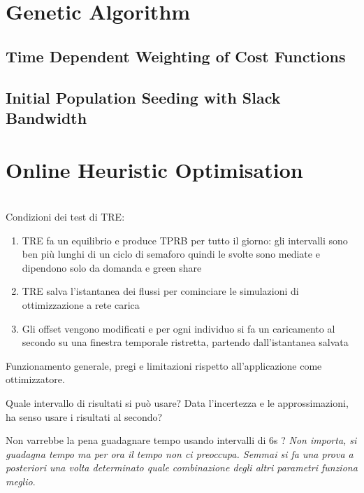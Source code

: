 
\section{Genetic Algorithm}
\subsection{Time Dependent Weighting of Cost Functions}


\subsection{Initial Population Seeding with Slack Bandwidth}




\section{Online Heuristic Optimisation}
\\
Condizioni dei test di TRE:
\begin{enumerate}
\item TRE fa un equilibrio e produce TPRB per tutto il giorno: gli intervalli sono ben più lunghi di un ciclo di semaforo quindi le svolte sono mediate e dipendono solo da domanda e green share
\item TRE salva l'istantanea dei flussi per cominciare le simulazioni di ottimizzazione a rete carica
\item Gli offset vengono modificati e per ogni individuo si fa un caricamento al secondo su una finestra temporale ristretta, partendo dall'istantanea salvata
\end{enumerate}






Funzionamento generale, pregi e limitazioni rispetto all'applicazione come ottimizzatore.

Quale intervallo di risultati si può usare? Data l'incertezza e le approssimazioni, ha senso usare i risultati al secondo?

Non varrebbe la pena guadagnare tempo usando intervalli di 6s ?
\emph{Non importa, si guadagna tempo ma per ora il tempo non ci preoccupa. Semmai si fa una prova a posteriori una volta determinato quale combinazione degli altri parametri funziona meglio}.





